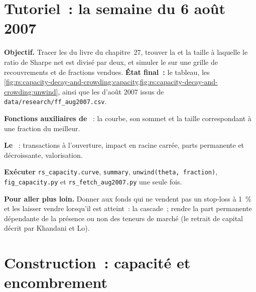 \section{Tutoriel~: la semaine du 6 août 2007}\label{tut:rs:capacity-decay-and-crowding:tut}

\begin{tutorial}
\textbf{Objectif.} Tracer les  du livre du chapitre~27, trouver la  et la taille à laquelle le ratio de Sharpe net est divisé par deux, et simuler
le  sur une grille de recouvrements et de fractions vendues. \textbf{État final~:} le tableau, les \cref{fig:rs:capacity-decay-and-crowding:capacity,fig:rs:capacity-decay-and-crowding:unwind},
ainsi que les  d'août 2007 issus de \texttt{data/research/ff\_aug2007.csv}.
\begin{tutsteps}
\item \textbf{Fonctions auxiliaires de }~: la courbe, son sommet et la taille correspondant à une fraction du meilleur.
\label{lst:rs:capacity-decay-and-crowding:curve}
\item \textbf{Le }~: transactions à l'ouverture, impact en racine carrée, parts permanente et décroissante, valorisation.
\label{lst:rs:capacity-decay-and-crowding:unwind}
\item \textbf{Exécuter} \texttt{rs\_capacity.curve}, \texttt{summary}, \texttt{unwind(theta, fraction)}, \texttt{fig\_capacity.py} et \texttt{rs\_fetch\_aug2007.py} une seule fois.
\end{tutsteps}
\textbf{Pour aller plus loin.} Donner aux fonds qui ne vendent pas un stop-loss à 1~\% et les laisser vendre lorsqu'il est atteint~: la cascade~; rendre la part permanente dépendante de
la présence ou non des teneurs de marché (le retrait de capital décrit par Khandani et Lo).
\end{tutorial}

\section{Construction~: capacité et encombrement}\label{bld:rs:capacity-decay-and-crowding:capacity}

